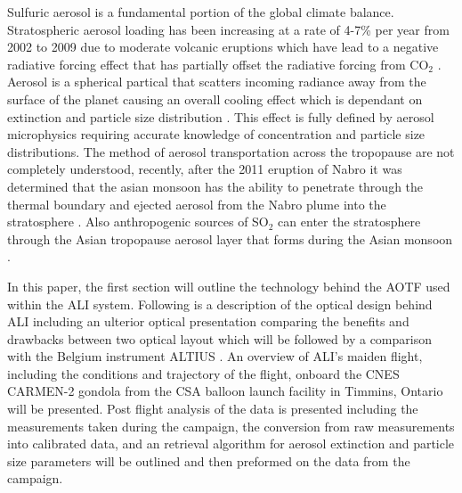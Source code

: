 \documentclass[12pt]{article}
\begin{document}
Sulfuric aerosol is a fundamental portion of the global climate balance. Stratospheric aerosol loading has been increasing at a rate of 4-7\% per year from 2002 to 2009 due to moderate volcanic eruptions \citep{Vernier2011} which have lead to a negative radiative forcing effect that has partially offset the radiative forcing from CO$_{2}$ \citep{Solomon2011}. Aerosol is a spherical partical that scatters incoming radiance away from the surface of the planet causing an overall cooling effect which is dependant on extinction and particle size distribution \citep{Kiehl1993}. This effect is fully defined by aerosol microphysics requiring accurate knowledge of concentration and particle size distributions. The method of aerosol transportation across the tropopause are not completely understood, recently, after the 2011 eruption of Nabro it was determined that the asian monsoon has the ability to penetrate through the thermal boundary and ejected aerosol from the Nabro plume into the stratosphere \citep{Bourassa2012c}. Also anthropogenic sources of SO$_{2}$ can enter the stratosphere through the Asian tropopause aerosol layer that forms during the Asian monsoon \citep{Vernier2011, Neely2014}.



In this paper, the first section will outline the technology behind the AOTF used within the ALI system. Following is a description of the optical design behind ALI including an ulterior optical presentation comparing the benefits and drawbacks between two optical layout which will be followed by a comparison with the Belgium instrument ALTIUS \citep{Dekemper2012}. An overview of ALI's maiden flight, including the conditions and trajectory of the flight, onboard the CNES CARMEN-2 gondola from the CSA balloon launch facility in Timmins, Ontario will be presented. Post flight analysis of the data is presented including the measurements taken during the campaign, the conversion from raw measurements into calibrated data, and an retrieval algorithm for aerosol extinction and particle size parameters will be outlined and then preformed on the data from the campaign.
\end{document}
